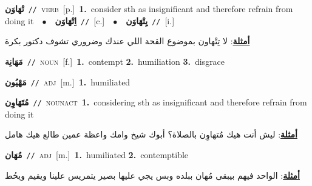 \documentclass[10pt,a4paper,twoside]{article} %
\begin{document}
\begin{multicols}{2}
{\setlength\topsep{0pt}\textbf{\foreignlanguage{arabic}{تْهَاوَن}}\ {\color{gray}\texttt{//}\color{black}}\ \textsc{verb}\ [p.]\ \textbf{1.}~consider sth as insignificant and therefore refrain from doing it\ \ $\bullet$\ \ \setlength\topsep{0pt}\textbf{\foreignlanguage{arabic}{اِتْهَاوَن}}\ {\color{gray}\texttt{//}\color{black}}\ [c.]\ \ $\bullet$\ \ \setlength\topsep{0pt}\textbf{\foreignlanguage{arabic}{يِتْهَاوَن}}\ {\color{gray}\texttt{//}\color{black}}\ [i.]\  \begin{flushright}\color{gray}\foreignlanguage{arabic}{\textbf{\underline{\foreignlanguage{arabic}{أمثلة}}}: لا تِتْهاون بموضوع القحة اللي عندك وضروري تشوف دكتور بكرة}\end{flushright}\color{black}} \vspace{2mm}

{\setlength\topsep{0pt}\textbf{\foreignlanguage{arabic}{مَهَانِة}}\ {\color{gray}\texttt{//}\color{black}}\ \textsc{noun}\ [f.]\ \textbf{1.}~contempt  \textbf{2.}~humiliation  \textbf{3.}~disgrace\ } \vspace{2mm}

{\setlength\topsep{0pt}\textbf{\foreignlanguage{arabic}{مَهْيُون}}\ {\color{gray}\texttt{//}\color{black}}\ \textsc{adj}\ [m.]\ \textbf{1.}~humiliated\ } \vspace{2mm}

{\setlength\topsep{0pt}\textbf{\foreignlanguage{arabic}{مُتَهَاوِن}}\ {\color{gray}\texttt{//}\color{black}}\ \textsc{noun\textunderscore act}\ \textbf{1.}~considering sth as insignificant and therefore refrain from doing it\  \begin{flushright}\color{gray}\foreignlanguage{arabic}{\textbf{\underline{\foreignlanguage{arabic}{أمثلة}}}: ليش أنت هيك مُتهاوِن بالصلاة؟ أبوك شيخ وامك واعظة عمين طالع هيك هامل}\end{flushright}\color{black}} \vspace{2mm}

{\setlength\topsep{0pt}\textbf{\foreignlanguage{arabic}{مُهَان}}\ {\color{gray}\texttt{//}\color{black}}\ \textsc{adj}\ [m.]\ \textbf{1.}~humiliated  \textbf{2.}~contemptible\  \begin{flushright}\color{gray}\foreignlanguage{arabic}{\textbf{\underline{\foreignlanguage{arabic}{أمثلة}}}: الواحد فيهم بيبقى مُهان ببلده وبس يجي عليها بصير يتمريس علينا ويقيم ويحُط}\end{flushright}\color{black}} \vspace{2mm}


\end{multicols}
\end{document}
